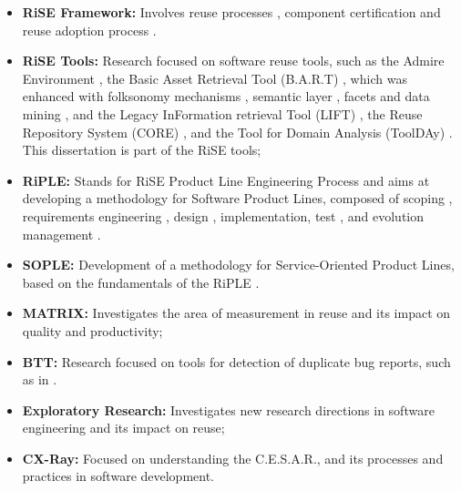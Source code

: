 \begin{itemize}
  \item \textbf{RiSE Framework:} Involves reuse processes
  \citep{Almeida2004,Nascimento2008}, component certification
  \citep{Alvaro2006} and reuse adoption process \citep{Garcia2008a}.
  
   \item \textbf{RiSE Tools:} Research focused on software reuse tools, such
   as the Admire Environment \citep{Mascena2006}, the Basic Asset Retrieval
   Tool (B.A.R.T) \citep{Santos2006}, which was enhanced with folksonomy
   mechanisms \citep{Vanderlei2007}, semantic layer \citep{Durao2008},
   facets \citep{Mendes2008} and data mining \citep{Martins2008}, and the
   Legacy InFormation retrieval Tool (LIFT) \citep{Brito2007}, the
   Reuse Repository System (CORE) \citep{CoreICSR}, and the Tool for Domain
   Analysis (ToolDAy) \citep{lisboa:msc:2008}. This dissertation is part of the RiSE tools;
   
   \item \textbf{RiPLE:}  Stands for RiSE Product Line Engineering Process and aims at developing   a methodology for Software Product Lines, composed of scoping \citep{Moraes2010},   requirements engineering \citep{neiva:msc:2009}, design \citep{filho:msc:2010,Cavalcanti:2011:ERP:2000259.2000286} , implementation, test \citep{neto:msc:2010,machado:msc:2010}, and evolution  management \citep{oliveira2009}.
   
   
   
   \item \textbf{SOPLE:} Development of a methodology for Service-Oriented Product Lines, based on the fundamentals of the RiPLE \citep{ribeiro2010}. 
   
   
   \item \textbf{MATRIX:} Investigates the area of measurement in reuse and
   its impact on quality and productivity;
   
   \item \textbf{BTT:} Research focused on tools for detection of duplicate
   bug reports, such as in \citet{CavalcantiFISL2008,CavalcantiInTech2012}.
   
   \item \textbf{Exploratory Research:} Investigates new research directions
   in software engineering and its impact on reuse;

   \item \textbf{CX-Ray:} Focused on understanding the \ac{C.E.S.A.R.}, and its
   processes and practices in software development.
\end{itemize}

